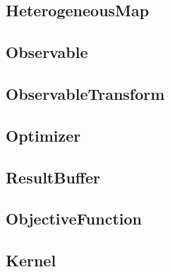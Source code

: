 \subsection{\textbf{HeterogeneousMap}}\label{subsec:hetmapclass}


\subsection{\textbf{Observable}}\label{subsec:observclass}


\subsection{\textbf{ObservableTransform}}\label{subsec:observtransclass}


\subsection{\textbf{Optimizer}}\label{subsec:optclass}


\subsection{\textbf{ResultBuffer}}\label{subsec:resbufclass}


\subsection{\textbf{ObjectiveFunction}}\label{subsec:objfuncclass}


\subsection{\textbf{Kernel}}\label{subsec:kerneltype}
